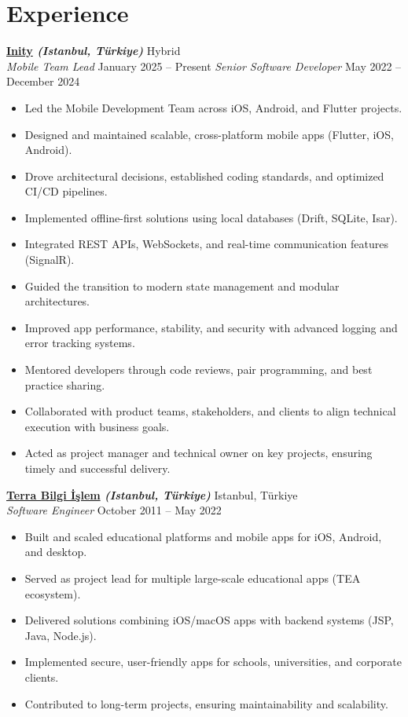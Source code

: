 \documentclass[10pt,a4paper]{extarticle}
\begin{document}
\section{Experience}
\textbf{\href{https://inity.com.tr}{Inity} \textit{(Istanbul, Türkiye)}} \hfill Hybrid\\
\textit{Mobile Team Lead} \hfill January 2025 -- Present
\textit{Senior Software Developer} \hfill May 2022 -- December 2024
\begin{itemize}[leftmargin=*,noitemsep,topsep=0pt]
    \item Led the Mobile Development Team across iOS, Android, and Flutter projects.
	\item Designed and maintained scalable, cross-platform mobile apps (Flutter, iOS, Android).
	\item Drove architectural decisions, established coding standards, and optimized CI/CD pipelines.
	\item Implemented offline-first solutions using local databases (Drift, SQLite, Isar).
	\item Integrated REST APIs, WebSockets, and real-time communication features (SignalR).
	\item Guided the transition to modern state management and modular architectures.
	\item Improved app performance, stability, and security with advanced logging and error tracking systems.
	\item Mentored developers through code reviews, pair programming, and best practice sharing.
	\item Collaborated with product teams, stakeholders, and clients to align technical execution with business goals.
\item Acted as project manager and technical owner on key projects, ensuring timely and successful delivery.
\end{itemize}
\textbf{\href{https://www.terrabilgiisilem}{Terra Bilgi İşlem} \textit{(Istanbul, Türkiye)}} \hfill Istanbul, Türkiye\\
\textit{Software Engineer} \hfill October 2011 -- May 2022
\begin{itemize}[leftmargin=*,noitemsep,topsep=0pt]
    \item Built and scaled educational platforms and mobile apps for iOS, Android, and desktop.
	\item Served as project lead for multiple large-scale educational apps (TEA ecosystem).
	\item Delivered solutions combining iOS/macOS apps with backend systems (JSP, Java, Node.js).
	\item Implemented secure, user-friendly apps for schools, universities, and corporate clients.
	\item Contributed to long-term projects, ensuring maintainability and scalability.
\end{itemize}
\end{document}
